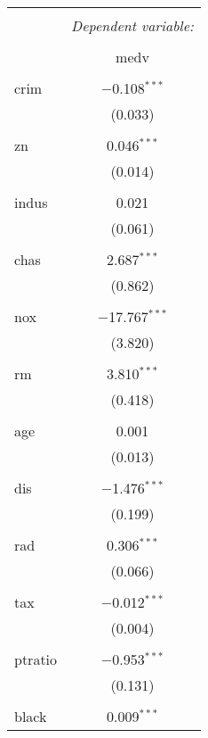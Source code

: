 
\begin{table}[!htbp] \centering 
  \caption{} 
  \label{} 
\begin{tabular}{@{\extracolsep{5pt}}lc} 
\\[-1.8ex]\hline 
\hline \\[-1.8ex] 
 & \multicolumn{1}{c}{\textit{Dependent variable:}} \\ 
\cline{2-2} 
\\[-1.8ex] & medv \\ 
\hline \\[-1.8ex] 
 crim & $-$0.108$^{***}$ \\ 
  & (0.033) \\ 
  & \\ 
 zn & 0.046$^{***}$ \\ 
  & (0.014) \\ 
  & \\ 
 indus & 0.021 \\ 
  & (0.061) \\ 
  & \\ 
 chas & 2.687$^{***}$ \\ 
  & (0.862) \\ 
  & \\ 
 nox & $-$17.767$^{***}$ \\ 
  & (3.820) \\ 
  & \\ 
 rm & 3.810$^{***}$ \\ 
  & (0.418) \\ 
  & \\ 
 age & 0.001 \\ 
  & (0.013) \\ 
  & \\ 
 dis & $-$1.476$^{***}$ \\ 
  & (0.199) \\ 
  & \\ 
 rad & 0.306$^{***}$ \\ 
  & (0.066) \\ 
  & \\ 
 tax & $-$0.012$^{***}$ \\ 
  & (0.004) \\ 
  & \\ 
 ptratio & $-$0.953$^{***}$ \\ 
  & (0.131) \\ 
  & \\ 
 black & 0.009$^{***}$ \\ 

\end{tabular}
\end{table}
